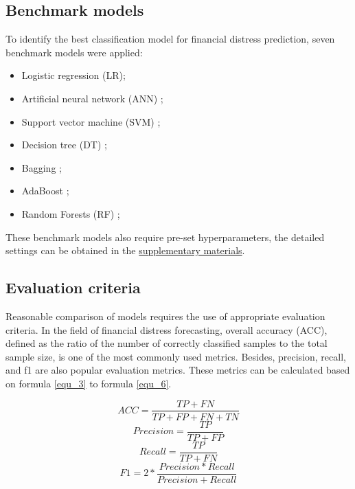 \documentclass[review]{elsarticle}
\begin{document}
\subsection{Benchmark models}
To identify the best classification model for financial distress prediction, seven benchmark models were applied:

\begin{itemize}
    \item Logistic regression (LR);
    \item Artificial neural network (ANN) \citep{Kohonen1988};
    \item Support vector machine (SVM) \citep{Cortes1995};
    \item Decision tree (DT) \citep{breiman1984classification};
    \item Bagging \citep{Breiman1996};
    \item AdaBoost \citep{Freund1995};
    \item Random Forests (RF) \citep{Breiman2001};
\end{itemize}

These benchmark models also require pre-set hyperparameters, the detailed settings can be obtained in the \hyperref[supplementary_materials]{supplementary materials}.

\subsection{Evaluation criteria}
Reasonable comparison of models requires the use of appropriate evaluation criteria. In the field of financial distress forecasting, overall accuracy (ACC), defined as the ratio of the number of correctly classified samples to the total sample size, is one of the most commonly used metrics. Besides, precision, recall, and f1 are also popular evaluation metrics. These metrics can be calculated based on formula \ref{equ_3} to formula \ref{equ_6}.

\begin{equation} \label{equ_3}
    ACC = \frac{TP+FN}{TP+FP+FN+TN}
\end{equation}
\begin{equation} \label{equ_4}
    Precision = \frac{TP}{TP+FP}
\end{equation}
\begin{equation} \label{equ_5}
    Recall = \frac{TP}{TP+FN}
\end{equation}
\begin{equation} \label{equ_6}
    F1 = 2*\frac{Precision*Recall}{Precision+Recall}
\end{equation}
\end{document}
